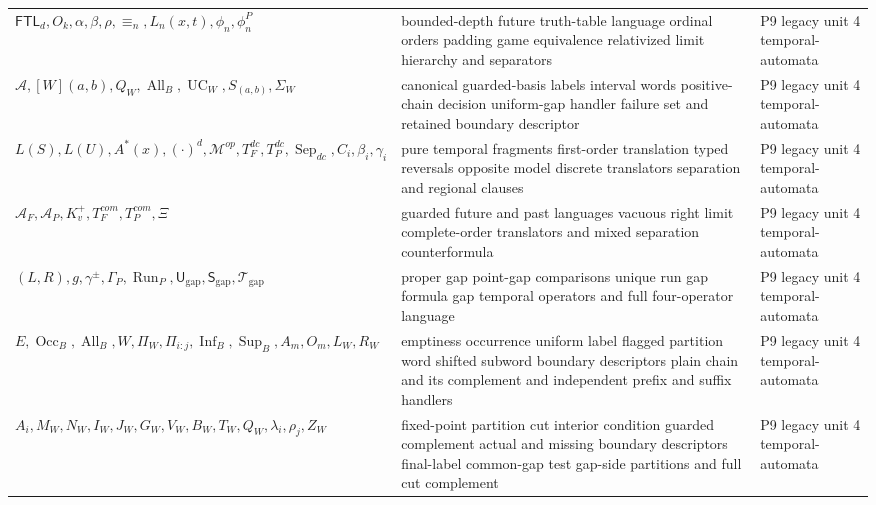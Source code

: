 \begin{longtable}{@{}p{}p{}p{}@{}}
\(\mathsf{FTL}_d,\allowbreak O_k,\allowbreak \alpha,\allowbreak \beta,\allowbreak \rho,\allowbreak \equiv_n,\allowbreak L_n(x,\allowbreak t),\allowbreak \phi_n,\allowbreak \phi_n^P\) & bounded-depth future truth-table language ordinal orders padding game equivalence relativized limit hierarchy and separators & P9 legacy unit 4 temporal-\allowbreak{}automata \\
\(\mathcal A,\allowbreak [W](a,\allowbreak b),\allowbreak Q_W,\allowbreak \operatorname{All}_B,\allowbreak \operatorname{UC}_W,\allowbreak S_{(a,b)},\allowbreak \Sigma_W\) & canonical guarded-basis labels interval words positive-chain decision uniform-gap handler failure set and retained boundary descriptor & P9 legacy unit 4 temporal-\allowbreak{}automata \\
\(L(S),\allowbreak L(U),\allowbreak A^*(x),\allowbreak (\cdot)^d,\allowbreak \mathcal M^{op},\allowbreak T_F^{dc},\allowbreak T_P^{dc},\allowbreak \operatorname{Sep}_{dc},\allowbreak C_i,\allowbreak \beta_i,\allowbreak \gamma_i\) & pure temporal fragments first-order translation typed reversals opposite model discrete translators separation and regional clauses & P9 legacy unit 4 temporal-\allowbreak{}automata \\
\(\mathcal A_F,\allowbreak \mathcal A_P,\allowbreak K_v^+,\allowbreak T_F^{com},\allowbreak T_P^{com},\allowbreak \Xi\) & guarded future and past languages vacuous right limit complete-order translators and mixed separation counterformula & P9 legacy unit 4 temporal-\allowbreak{}automata \\
\((L,\allowbreak R),\allowbreak g,\allowbreak \gamma^\pm,\allowbreak \Gamma_P,\allowbreak \operatorname{Run}_P,\allowbreak \mathsf U_{\mathrm{gap}},\allowbreak \mathsf S_{\mathrm{gap}},\allowbreak \mathcal T_{\mathrm{gap}}\) & proper gap point-gap comparisons unique run gap formula gap temporal operators and full four-operator language & P9 legacy unit 4 temporal-\allowbreak{}automata \\
\(E,\allowbreak \operatorname{Occ}_B,\allowbreak \operatorname{All}_B,\allowbreak W,\allowbreak \Pi_W,\allowbreak \Pi_{i:j},\allowbreak \operatorname{Inf}_B,\allowbreak \operatorname{Sup}_B,\allowbreak A_m,\allowbreak O_m,\allowbreak L_W,\allowbreak R_W\) & emptiness occurrence uniform label flagged partition word shifted subword boundary descriptors plain chain and its complement and independent prefix and suffix handlers & P9 legacy unit 4 temporal-\allowbreak{}automata \\
\(A_i,\allowbreak M_W,\allowbreak N_W,\allowbreak I_W,\allowbreak J_W,\allowbreak G_W,\allowbreak V_W,\allowbreak B_W,\allowbreak T_W,\allowbreak Q_W,\allowbreak \lambda_i,\allowbreak \rho_j,\allowbreak Z_W\) & fixed-point partition cut interior condition guarded complement actual and missing boundary descriptors final-label common-gap test gap-side partitions and full cut complement & P9 legacy unit 4 temporal-\allowbreak{}automata \\

\end{longtable}
